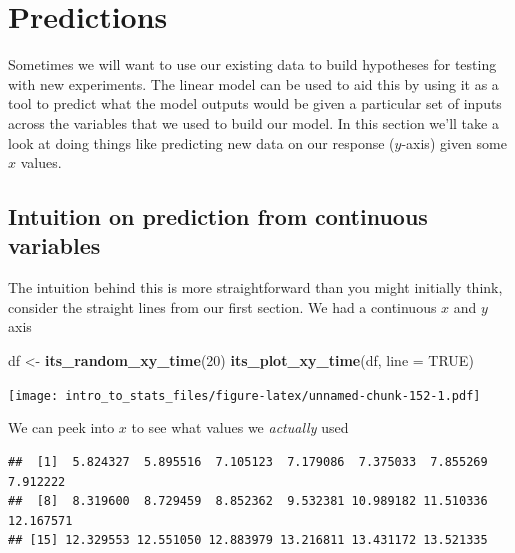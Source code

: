 \documentclass[
]{book}
\newenvironment{Shaded}{\begin{snugshade}}{\end{snugshade}}
\newcommand{\DataTypeTok}[1]{\textcolor[rgb]{0.13,0.29,0.53}{#1}}
\newcommand{\DecValTok}[1]{\textcolor[rgb]{0.00,0.00,0.81}{#1}}
\newcommand{\KeywordTok}[1]{\textcolor[rgb]{0.13,0.29,0.53}{\textbf{#1}}}
\newcommand{\NormalTok}[1]{#1}
\newcommand{\OperatorTok}[1]{\textcolor[rgb]{0.81,0.36,0.00}{\textbf{#1}}}
\newcommand{\OtherTok}[1]{\textcolor[rgb]{0.56,0.35,0.01}{#1}}
\newcommand{\StringTok}[1]{\textcolor[rgb]{0.31,0.60,0.02}{#1}}
\begin{document}
\hypertarget{predictions}{%
\section{Predictions}\label{predictions}}

Sometimes we will want to use our existing data to build hypotheses for testing with new experiments. The linear model can be used to aid this by using it as a tool to predict what the model outputs would be given a particular set of inputs across the variables that we used to build our model. In this section we'll take a look at doing things like predicting new data on our response (\(y\)-axis) given some \(x\) values.

\hypertarget{intuition-on-prediction-from-continuous-variables}{%
\subsection{Intuition on prediction from continuous variables}\label{intuition-on-prediction-from-continuous-variables}}

The intuition behind this is more straightforward than you might initially think, consider the straight lines from our first section. We had a continuous \(x\) and \(y\) axis

\begin{Shaded}
\begin{Highlighting}[]
\NormalTok{df <-}\StringTok{ }\KeywordTok{its_random_xy_time}\NormalTok{(}\DecValTok{20}\NormalTok{)}
\KeywordTok{its_plot_xy_time}\NormalTok{(df, }\DataTypeTok{line =} \OtherTok{TRUE}\NormalTok{)}
\end{Highlighting}
\end{Shaded}

\texttt{[image: intro\_to\_stats\_files/figure-latex/unnamed-chunk-152-1.pdf]}

We can peek into \(x\) to see what values we \emph{actually} used

\begin{Shaded}
\end{Shaded}

\begin{verbatim}
##  [1]  5.824327  5.895516  7.105123  7.179086  7.375033  7.855269  7.912222
##  [8]  8.319600  8.729459  8.852362  9.532381 10.989182 11.510336 12.167571
## [15] 12.329553 12.551050 12.883979 13.216811 13.431172 13.521335
\end{verbatim}
\end{document}
